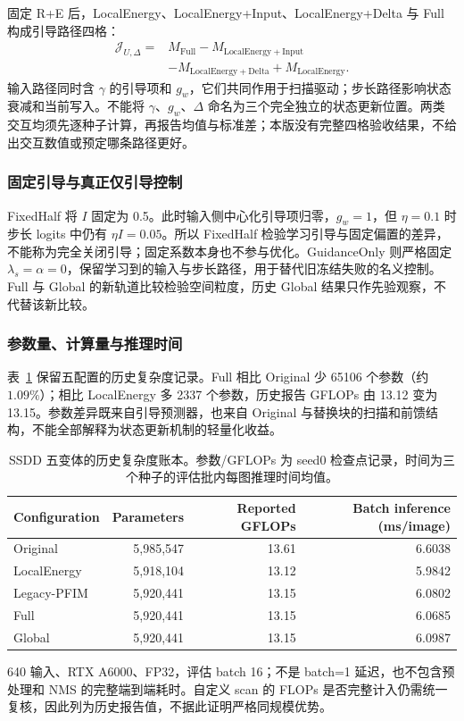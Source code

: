 固定 R+E 后，LocalEnergy、LocalEnergy+Input、LocalEnergy+Delta 与 Full 构成引导路径四格：
\begin{equation}
\begin{aligned}
\mathcal{J}_{U,\Delta}={}&M_{\mathrm{Full}}-M_{\mathrm{LocalEnergy+Input}}\\
&-M_{\mathrm{LocalEnergy+Delta}}+M_{\mathrm{LocalEnergy}}.
\end{aligned}
\label{eq:interaction_ud}
\end{equation}
输入路径同时含 $\gamma$ 的引导项和 $g_w$，它们共同作用于扫描驱动；步长路径影响状态衰减和当前写入。不能将 $\gamma$、$g_w$、$\Delta$ 命名为三个完全独立的状态更新位置。两类交互均须先逐种子计算，再报告均值与标准差；本版没有完整四格验收结果，不给出交互数值或预定哪条路径更好。

\subsubsection{固定引导与真正仅引导控制}
FixedHalf 将 $I$ 固定为 0.5。此时输入侧中心化引导项归零，$g_w=1$，但 $\eta=0.1$ 时步长 logits 中仍有 $\eta I=0.05$。所以 FixedHalf 检验学习引导与固定偏置的差异，不能称为完全关闭引导；固定系数本身也不参与优化。GuidanceOnly 则严格固定 $\lambda_s=\alpha=0$，保留学习到的输入与步长路径，用于替代旧冻结失败的名义控制。Full 与 Global 的新轨道比较检验空间粒度，历史 Global 结果只作先验观察，不代替该新比较。

\subsubsection{参数量、计算量与推理时间}
表~\ref{tab:complexity_ablation} 保留五配置的历史复杂度记录。Full 相比 Original 少 65106 个参数（约 $1.09\%$）；相比 LocalEnergy 多 2337 个参数，历史报告 GFLOPs 由 13.12 变为 13.15。参数差异既来自引导预测器，也来自 Original 与替换块的扫描和前馈结构，不能全部解释为状态更新机制的轻量化收益。

\begin{table}[tp]
\centering\small
\caption{SSDD 五变体的历史复杂度账本。参数/GFLOPs 为 seed0 检查点记录，时间为三个种子的评估批内每图推理时间均值。}\label{tab:complexity_ablation}
\begin{tabular*}{\textwidth}{@{\extracolsep{\fill}}lrrr}
\toprule
Configuration & Parameters & Reported GFLOPs & Batch inference (ms/image)\\
\midrule
Original & 5,985,547 & 13.61 & 6.6038\\
LocalEnergy & 5,918,104 & 13.12 & 5.9842\\
Legacy-PFIM & 5,920,441 & 13.15 & 6.0802\\
Full & 5,920,441 & 13.15 & 6.0685\\
Global & 5,920,441 & 13.15 & 6.0987\\
\bottomrule
\end{tabular*}
\smallskip
\begin{minipage}{\linewidth}\footnotesize
640 输入、RTX A6000、FP32，评估 batch 16；不是 batch=1 延迟，也不包含预处理和 NMS 的完整端到端耗时。自定义 scan 的 FLOPs 是否完整计入仍需统一复核，因此列为历史报告值，不据此证明严格同规模优势。
\end{minipage}
\end{table}

